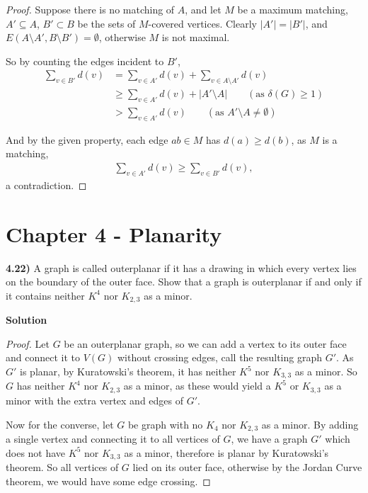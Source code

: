 \documentclass[11pt]{article}
\theoremstyle{plain}
\begin{document}
\begin{proof}
Suppose there is no matching of $A$, and let $M$ be a maximum matching, $A' \subseteq A$, $B' \subset B$ be the sets of $M$-covered vertices. Clearly $|A'| = |B'|$, and $E(A \setminus A',B \setminus B') = \emptyset$, otherwise $M$ is not maximal.

So by counting the edges incident to $B'$,
\begin{align*}
\sum \limits_{v \in B'} d(v) & = \sum \limits_{v \in A'} d(v) + \sum \limits_{v \in A\setminus A'} d(v) \\
& \geq \sum \limits_{v \in A'}d(v)  + |A' \setminus A| \qquad (\text{as } \delta(G) \geq 1)\\
& > \sum \limits_{v \in A'} d(v)  \qquad (\text{as } A' \setminus A \neq \emptyset) 
\end{align*}

And by the given property, each edge $ab \in M$ has $d(a) \geq d(b)$, as $M$ is a matching, 
\begin{align*}
\sum \limits_{v \in A'} d(v) \geq \sum \limits_{v \in B'} d(v) ,
\end{align*}
a contradiction.

\end{proof}



\section*{Chapter 4 - Planarity}

\textbf{4.22)} A graph is called outerplanar if it has a drawing in which every vertex lies on the boundary of the outer face. Show that a graph is outerplanar if and only if it contains neither $K^4$ nor $K_{2,3}$ as a minor.

\textbf{Solution}

\begin{proof}
Let $G$ be an outerplanar graph, so we can add a vertex to its outer face and connect it to $V(G)$ without crossing edges, call the resulting graph $G'$. As $G'$ is planar, by Kuratowski's theorem, it has neither $K^5$ nor $K_{3,3}$ as a minor. So $G$ has neither $K^4$ nor $K_{2,3}$ as a minor, as these would yield a $K^5$ or $K_{3,3}$ as a minor with the extra vertex and edges of $G'$.

Now for the converse, let $G$ be graph with no $K_4$ nor $K_{2,3}$ as a minor. By adding a single vertex and connecting it to all vertices of $G$, we have a graph $G'$ which does not have $K^5$ nor $K_{3,3}$ as a minor, therefore is planar by Kuratowski's theorem. So all vertices of $G$ lied on its outer face, otherwise by the Jordan Curve theorem, we would have some edge crossing. 
\end{proof}
\end{document}
